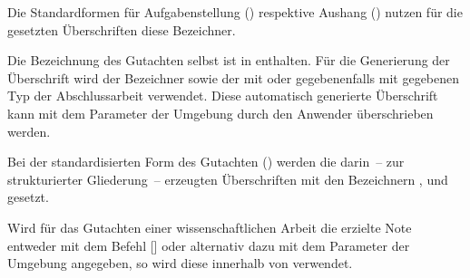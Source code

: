 \begin{Bundle*}{}
\begin{Declaration}{}
\begin{Declaration}{}
\printdeclarationlist%
%
Die Standardformen für Aufgabenstellung () respektive Aushang 
() nutzen für die gesetzten Überschriften diese Bezeichner.
\end{Declaration}
\end{Declaration}

\begin{Declaration}{}
\begin{Declaration}{}
\printdeclarationlist%
%
Die Bezeichnung des Gutachten selbst ist in  enthalten. 
Für die Generierung der Überschrift wird der Bezeichner  
sowie der mit  oder gegebenenfalls mit  gegebenen 
Typ der Abschlussarbeit verwendet. Diese automatisch generierte Überschrift 
kann mit dem Parameter  der 
Umgebung  durch den Anwender überschrieben werden.
\end{Declaration}
\end{Declaration}

\begin{Declaration}{}
\begin{Declaration}{}
\printdeclarationlist%
%
Bei der standardisierten Form des Gutachten () werden die 
darin~-- zur strukturierter Gliederung~-- erzeugten Überschriften mit den 
Bezeichnern ,  und  
gesetzt.
\end{Declaration}
\end{Declaration}

\begin{Declaration}{}
\printdeclarationlist%
%
Wird für das Gutachten einer wissenschaftlichen Arbeit die erzielte Note 
entweder mit dem Befehl [] oder alternativ dazu 
mit dem Parameter  der 
Umgebung  angegeben, so wird diese innerhalb von 
 verwendet.
\end{Declaration}


\end{Bundle*}
